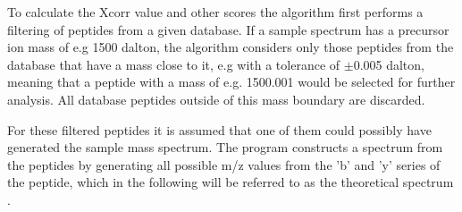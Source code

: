 \documentclass[11pt]{article}
\begin{document}
To calculate the Xcorr value and other scores the algorithm first performs a filtering of peptides from a given database. If a sample spectrum has a precursor ion mass of e.g 1500 dalton, the algorithm considers only those peptides from the database that have a mass close to it, e.g with a tolerance of  $\pm$0.005 dalton, meaning that a peptide with a mass of e.g. 1500.001 would be selected for further analysis. All database peptides outside of this mass boundary are discarded.

For these filtered peptides it is assumed that one of them could possibly have generated the sample mass spectrum. The program constructs a spectrum from the peptides by generating all possible m/z values from the 'b' and 'y' series of the peptide, which in the following will be referred to as the theoretical spectrum \cite{comet-first-paper}. 
\end{document}
